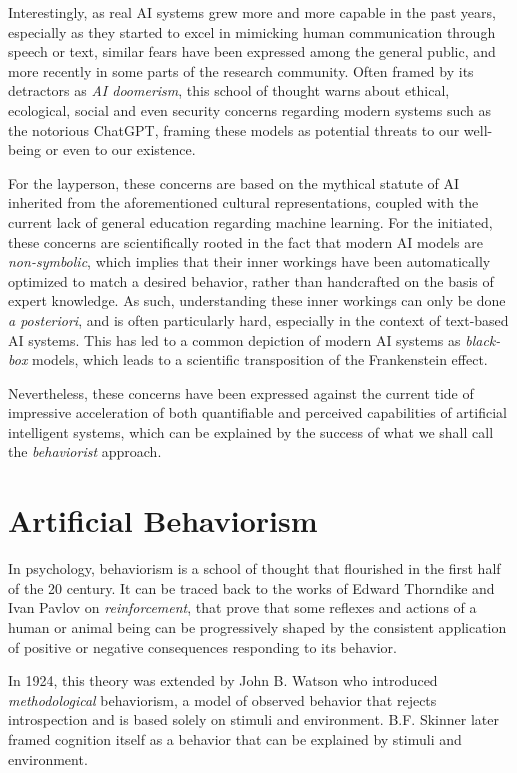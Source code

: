 Interestingly, as real AI systems grew more and more capable in the past years, especially as they started to excel in mimicking human communication through speech or text, similar fears have been expressed among the general public, and more recently in some parts of the research community. Often framed by its detractors as \textit{AI doomerism}, this school of thought warns about ethical, ecological, social and even security concerns regarding modern systems such as the notorious ChatGPT, framing these models as potential threats to our well-being or even to our existence.

For the layperson, these concerns are based on the mythical statute of AI inherited from the aforementioned cultural representations, coupled with the current lack of general education regarding machine learning. For the initiated, these concerns are scientifically rooted in the fact that modern AI models are \textit{non-symbolic}, which implies that their inner workings have been automatically optimized to match a desired behavior, rather than handcrafted on the basis of expert knowledge. As such, understanding these inner workings can only be done \textit{a posteriori}, and is often particularly hard, especially in the context of text-based AI systems. This has led to a common depiction of modern AI systems as \textit{black-box} models, which leads to a scientific transposition of the Frankenstein effect.

Nevertheless, these concerns have been expressed against the current tide of impressive acceleration of both quantifiable and perceived capabilities of artificial intelligent systems, which can be explained by the success of what we shall call the \textit{behaviorist} approach.

\section{Artificial Behaviorism}

In psychology, behaviorism is a school of thought that flourished in the first half of the 20 century. It can be traced back to the works of Edward Thorndike and Ivan Pavlov on \textit{reinforcement}, that prove that some reflexes and actions of a human or animal being can be progressively shaped by the consistent application of positive or negative consequences responding to its behavior. 

In 1924, this theory was extended by John B. Watson who introduced \textit{methodological} behaviorism, a model of observed behavior that rejects introspection and is based solely on stimuli and environment. B.F. Skinner later framed cognition itself as a behavior that can be explained by stimuli and environment.

